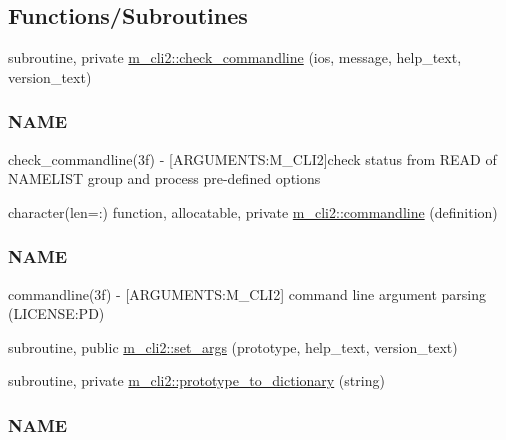 \subsection*{Functions/\+Subroutines}
\begin{DoxyCompactItemize}
\item 
subroutine, private \mbox{\hyperlink{namespacem__cli2_a02d4639b325d1b8c6fd3b03ba515f2b3}{m\+\_\+cli2\+::check\+\_\+commandline}} (ios, message, help\+\_\+text, version\+\_\+text)
\begin{DoxyCompactList}\small\item\em \subsubsection*{N\+A\+ME}

check\+\_\+commandline(3f) -\/ \mbox{[}A\+R\+G\+U\+M\+E\+N\+TS\+:M\+\_\+\+C\+L\+I2\mbox{]}check status from R\+E\+AD of N\+A\+M\+E\+L\+I\+ST group and process pre-\/defined options \end{DoxyCompactList}\item 
character(len=\+:) function, allocatable, private \mbox{\hyperlink{namespacem__cli2_a85c38a938a7dd9a749daf8effe45c109}{m\+\_\+cli2\+::commandline}} (definition)
\begin{DoxyCompactList}\small\item\em \subsubsection*{N\+A\+ME}

commandline(3f) -\/ \mbox{[}A\+R\+G\+U\+M\+E\+N\+TS\+:M\+\_\+\+C\+L\+I2\mbox{]} command line argument parsing (L\+I\+C\+E\+N\+SE\+:PD) \end{DoxyCompactList}\item 
subroutine, public \mbox{\hyperlink{namespacem__cli2_a6d20994aa80217dd3d0ffd1d5586f736}{m\+\_\+cli2\+::set\+\_\+args}} (prototype, help\+\_\+text, version\+\_\+text)
\item 
subroutine, private \mbox{\hyperlink{namespacem__cli2_a14896d00e509cbc32f4df993a8d6f75b}{m\+\_\+cli2\+::prototype\+\_\+to\+\_\+dictionary}} (string)
\begin{DoxyCompactList}\small\item\em \subsubsection*{N\+A\+ME}


\end{DoxyCompactList}
\end{DoxyCompactItemize}
